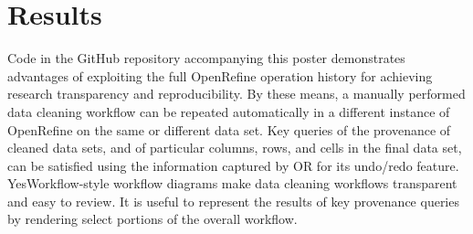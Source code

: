 \section{Results}

Code in the GitHub repository accompanying this poster demonstrates advantages of exploiting the full OpenRefine operation history for achieving research transparency and reproducibility. By these means, a manually performed data cleaning workflow can be repeated automatically in a different instance of OpenRefine on the same or different data set. Key queries of the provenance of cleaned data sets, and of particular columns, rows, and cells in the final data set, can be satisfied using the information captured by OR for its undo/redo feature.  YesWorkflow-style workflow diagrams make data cleaning workflows transparent and easy to review.  It is useful to represent the results of key provenance queries by rendering select portions of the overall workflow.